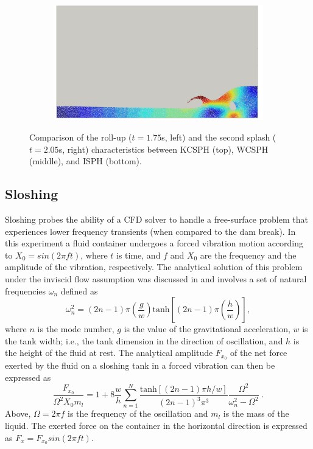 \begin{figure}[H]
\begin{subfigure}{0.4\columnwidth}
	\end{subfigure}
	\begin{subfigure}{0.4\columnwidth}
		\centering
		\includegraphics[width=1.0\textwidth]{images/SPH_Comparison/isph_2.png}
	\end{subfigure}
	\caption{Comparison of the roll-up ($t=1.75$\si{s}, left) and the second splash ($t=2.05$\si{s}, right) characteristics between KCSPH (top), WCSPH (middle), and ISPH (bottom).}    
	\label{fig:db_charac}
\end{figure}

\subsection{Sloshing}
Sloshing probes the ability of a CFD solver to handle a free-surface problem that experiences lower frequency transients (when compared to the dam break). In this experiment a fluid container undergoes a forced vibration motion according to $X_0 = sin(2\pi f t)$, where $t$ is time, and $f$ and $X_0$ are the frequency and the amplitude of the vibration, respectively. The analytical solution of this problem under the inviscid flow assumption was discussed in \cite{Dodge2000} and involves a set of natural frequencies $\omega_n$ defined as
\[
\omega_n^2 =\left(2n-1\right) \pi \left(\frac{g}{w}\right) \text{tanh} \left[\left(2n-1\right) \pi \left(\frac{h}{w}\right)\right],
\]
where $n$ is the mode number, $g$ is the value of the gravitational acceleration, $w$ is the tank width; i.e., the tank dimension in the direction of oscillation, and $h$ is the height of the fluid at rest. The analytical amplitude $F_{x_0}$ of the net force exerted by the fluid on a sloshing tank in a forced vibration can then be expressed as 
\begin{equation*} 
\frac{F_{x_0}}{\Omega^2 X_0 m_l} = 1 + 8\frac{w}{h} \sum_{n=1}^{N} \frac{\text{tanh}\left[\left(2n-1\right) \pi h / w\right]}{\left(2n-1\right)^3 \pi ^3} \frac{\Omega ^2}{\omega_n^2 - \Omega^2} \;.
\end{equation*}
Above, $\Omega=2\pi f$ is the frequency of the oscillation and $m_l$ is the mass of the liquid. The exerted force on the container in the horizontal direction is expressed as  $F_x=F_{x_0} sin(2\pi f t)$.

